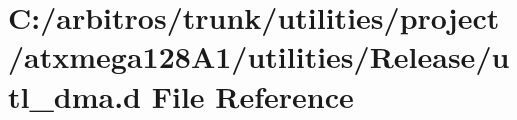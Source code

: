 \hypertarget{utilities_2project_2atxmega128_a1_2utilities_2_release_2utl__dma_8d}{\section{C\-:/arbitros/trunk/utilities/project/atxmega128\-A1/utilities/\-Release/utl\-\_\-dma.d File Reference}
\label{utilities_2project_2atxmega128_a1_2utilities_2_release_2utl__dma_8d}
}
